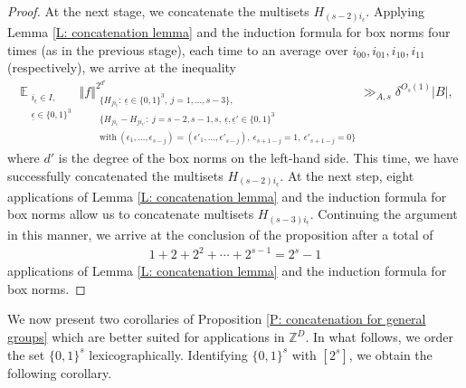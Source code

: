 \documentclass[11pt]{amsart}
\theoremstyle{definition}
\DeclareMathOperator*{\E}{\mathbb{E}}
\newcommand{\Z}{{\mathbb Z}}
\newcommand{\ueps}{{\underline{\epsilon}}}
\newcommand{\norm}[1]{\left\Vert #1\right\Vert}
\begin{document}
\begin{proof}
At the next stage, we concatenate the multisets $H_{(s-2)i_\ueps}$. Applying Lemma \ref{L: concatenation lemma} and the induction formula for box norms four times (as in the previous stage), each time to an average over $i_{00}, i_{01}, i_{10}, i_{11}$ (respectively), we arrive at the inequality
\begin{align*}
        \E_{\substack{i_{\ueps}\in I,\\ \ueps\in\{0,1\}^3}} \norm{f}_{\substack{\{H_{j i_\ueps}:\ \ueps\in\{0,1\}^3,\ j=1, \ldots, s-3\},\\ \{H_{j i_\ueps}-H_{j i_{\ueps'}}:\ j= s-2, s-1, s,\ \ueps,\ueps'\in\{0,1\}^3\\ \mathrm{with}\ (\epsilon_1, \ldots, \epsilon_{s-j}) = (\epsilon'_1, \ldots, \epsilon'_{s-j}),\ \epsilon_{s+1-j} = 1,\ \epsilon'_{s+1-j} = 0\}}}^{2^{d'}} %
        \gg_{A, s} \delta^{O_s(1)}|B|,
\end{align*}
where $d'$ is the degree of the box norms on the left-hand side.
This time, we have successfully concatenated the {multisets} $H_{(s-2)i_\ueps}$. At the next step, eight applications of Lemma \ref{L: concatenation lemma} and the induction formula for box norms allow us to concatenate {multisets} $H_{(s-3)i_\ueps}$. Continuing the argument in this manner, we arrive at the conclusion of the proposition after a total of 
\begin{align*}
    1 + 2 + 2^2 + \cdots + 2^{s-1} = 2^s - 1
\end{align*}
applications of Lemma \ref{L: concatenation lemma} and the induction formula for box norms.
\end{proof}

We now present two corollaries of Proposition \ref{P: concatenation for general groups} which are better suited for applications in $\Z^D$. 
In what follows, we order the set $\{0,1\}^s$ lexicographically.
Identifying $\{0,1\}^s$ with $[2^s]$, we obtain the following corollary.
\end{document}
